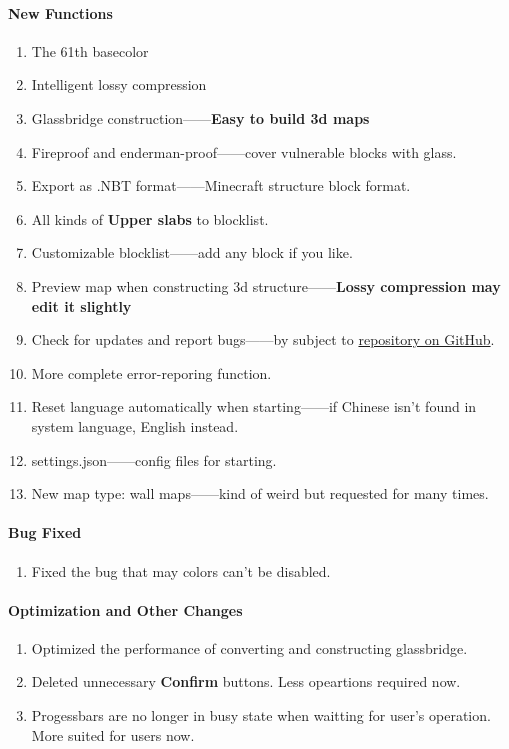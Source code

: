 \documentclass{article}
\begin{document}
    \paragraph{New Functions}
    \begin{enumerate}
        \item The 61th basecolor
        \item Intelligent lossy compression
        \item Glassbridge construction——\textbf{Easy to build 3d maps}
        \item Fireproof and enderman-proof——cover vulnerable blocks with glass.
        \item Export as .NBT format——Minecraft structure block format.
        \item All kinds of \textbf{Upper slabs} to blocklist.
        \item Customizable blocklist——add any block if you like.
        \item Preview map when constructing 3d structure——\textbf{Lossy compression may edit it slightly}
        \item Check for updates and report bugs——by subject to \href{https://github.com/ToKiNoBug/SlopeCraft}{repository on GitHub}.
        \item More complete error-reporing function.
        \item Reset language automatically when starting——if Chinese isn't found in system language, English instead.
        \item settings.json——config files for starting.
        \item New map type: wall maps——kind of weird but requested for many times.
    \end{enumerate}
    \paragraph{Bug Fixed}
    \begin{enumerate}
        \item Fixed the bug that may colors can't be disabled.
    \end{enumerate}
    \paragraph{Optimization and Other Changes}
    \begin{enumerate}        
        \item Optimized the performance of converting and constructing glassbridge.
        \item Deleted unnecessary \textbf{Confirm} buttons. Less opeartions required now.
        \item Progessbars are no longer in busy state when waitting for user's operation. More suited for users now.
    \end{enumerate}
\end{document}
